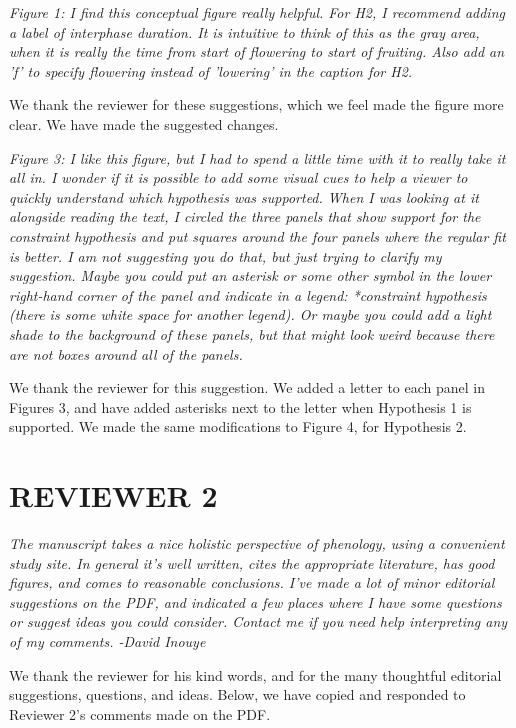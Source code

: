 \documentclass[10.95pt,a4paper]{letter}
\begin{document}
\par \emph{Figure 1: I find this conceptual figure really helpful.  For H2, I recommend adding a label of interphase duration.  It is intuitive to think of this as the gray area, when it is really the time from start of flowering to start of fruiting.  Also add an 'f' to specify flowering instead of 'lowering' in the caption for H2.} 
\par We thank the reviewer for these suggestions, which we feel made the figure more clear. We have made the suggested changes. 


\par \emph{Figure 3:  I like this figure, but I had to spend a little time with it to really take it all in.  I wonder if it is possible to add some visual cues to help a viewer to quickly understand which hypothesis was supported.  When I was looking at it alongside reading the text, I circled the three panels that show support for the constraint hypothesis and put squares around the four panels where the regular fit is better.  I am not suggesting you do that, but just trying to clarify my suggestion.  Maybe you could put an asterisk or some other symbol in the lower right-hand corner of the panel and indicate in a legend: *constraint hypothesis (there is some white space for another legend). Or maybe you could add a light shade to the background of these panels, but that might look weird because there are not boxes around all of the panels.} 
\par We thank the reviewer for this suggestion. We added a letter to each panel in Figures 3, and have added asterisks next to the letter when Hypothesis 1 is supported. We made the same modifications to Figure 4, for Hypothesis 2. \\

\section {REVIEWER 2}

\par \emph{The manuscript takes a nice holistic perspective of phenology, using a convenient study site. In general it's well written, cites the appropriate literature, has good figures, and comes to reasonable conclusions. I've made a lot of minor editorial suggestions on the PDF, and indicated a few places where I have some questions or suggest ideas you could consider. Contact me if you need help interpreting any of my comments. 
-David Inouye}
\par We thank the reviewer for his kind words, and for the many thoughtful editorial suggestions, questions, and ideas. Below, we have copied and responded to Reviewer 2's comments made on the PDF.
\end{document}
